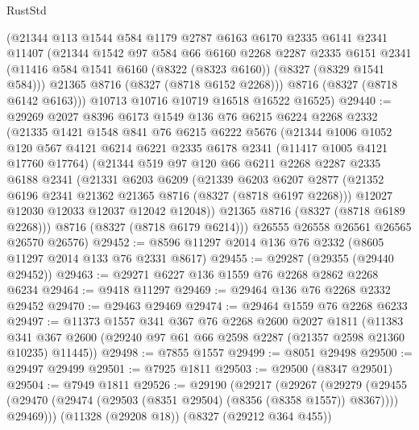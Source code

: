 \begin{lexlean}{RustStd}
\begin{coremodule}
      (@21344
        @113
        @1544
        @584
        @1179
        @2787
        @6163
        @6170
        @2335
        @6141
        @2341
        @11407
        (@21344
          @1542
          @97
          @584
          @66
          @6160
          @2268
          @2287
          @2335
          @6151
          @2341
          (@11416 @584 @1541 @6160 (@8322 (@8323 @6160)) (@8327 (@8329 @1541 @584)))
          @21365
          @8716
          (@8327 (@8718 @6152 @2268)))
        @8716
        (@8327 (@8718 @6142 @6163)))
      @10713
      @10716
      @10719
      @16518
      @16522
      @16525)
@29440 := @29269
    @2027
    @8396
    @6173
    @1549
    @136
    @76
    @6215
    @6224
    @2268
    @2332
    (@21335
      @1421
      @1548
      @841
      @76
      @6215
      @6222
      @5676
      (@21344
        @1006
        @1052
        @120
        @567
        @4121
        @6214
        @6221
        @2335
        @6178
        @2341
        (@11417 @1005 @4121 @17760 @17764)
        (@21344
          @519
          @97
          @120
          @66
          @6211
          @2268
          @2287
          @2335
          @6188
          @2341
          (@21331
            @6203
            @6209
            (@21339
              @6203
              @6207
              @2877
              (@21352 @6196 @2341 @21362 @21365 @8716 (@8327 (@8718 @6197 @2268)))
              @12027
              @12030
              @12033
              @12037
              @12042
              @12048))
          @21365
          @8716
          (@8327 (@8718 @6189 @2268)))
        @8716
        (@8327 (@8718 @6179 @6214)))
      @26555
      @26558
      @26561
      @26565
      @26570
      @26576)
@29452 := @8596 @11297 @2014 @136 @76 @2332 (@8605 @11297 @2014 @133 @76 @2331 @8617)
@29455 := @29287 (@29355 (@29440 @29452))
@29463 := @29271 @6227 @136 @1559 @76 @2268 @2862 @2268 @6234
@29464 := @9418 @11297
@29469 := @29464 @136 @76 @2268 @2332 @29452
@29470 := @29463 @29469
@29474 := @29464 @1559 @76 @2268 @6233
@29497 := @11373
    @1557
    @341
    @367
    @76
    @2268
    @2600
    @2027
    @1811
    (@11383 @341 @367 @2600 (@29240 @97 @61 @66 @2598 @2287 (@21357 @2598 @21360 @10235) @11445))
@29498 := @7855 @1557
@29499 := @8051 @29498
@29500 := @29497 @29499
@29501 := @7925 @1811
@29503 := @29500 (@8347 @29501)
@29504 := @7949 @1811
@29526 := @29190
    (@29217
      (@29267
        (@29279
          (@29455 (@29470 (@29474 (@29503 (@8351 @29504) (@8356 (@8358 @1557)) @8367))))
          @29469)))
    (@11328 (@29208 @18))
    (@8327 (@29212 @364 @455))

\end{coremodule}
\end{lexlean}
